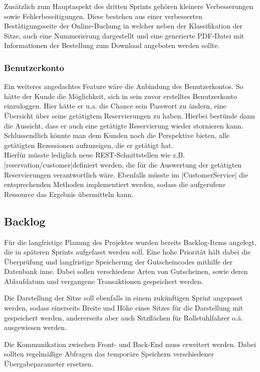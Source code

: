 Zusätzlich zum Hauptaspekt des dritten Sprints gehören kleinere Verbesserungen sowie Fehlerbeseitigungen. 
Diese bestehen aus einer verbesserten Bestätigungsseite der Online-Buchung in welcher neben der Klassifikation der Sitze, auch eine Nummerierung dargestellt und eine generierte PDF-Datei mit Informationen der Bestellung zum Download angeboten werden sollte.

\subsubsection*{Benutzerkonto}
\label{ssssec:sprint_benuterkonto}
Ein weiteres angedachtes Feature wäre die Anbindung des Benutzerkontos.
So hätte der Kunde die Möglichkeit, sich in sein zuvor erstelltes Benutzerkonto einzuloggen. 
Hier hätte er u.a. die Chance sein Passwort zu ändern, eine Übersicht über seine getätigtem Reservierungen zu haben. 
Hierbei bestünde dann die Aussicht, dass er auch eine getätigte Reservierung wieder stornieren kann. 
Schlussendlich könnte man dem Kunden noch die Perspektive bieten, alle getätigten Rezessionen aufzuzeigen, die er getätigt hat. \\

Hierfür müsste lediglich neue \acs{REST}-Schnittstellen wie z.B. \jinline|reservation/customer|definiert werden, die für die Auswertung der getätigten Reservierungen verantwortlich wäre. 
Ebenfalls müsste im \jinline|CustomerService| die entsprechenden Methoden implementiert werden, sodass die aufgerufene Ressource das Ergebnis übermitteln kann.

\subsection{Backlog}
Für die langfristige Planung des Projektes wurden bereits Backlog-Items angelegt, die in späteren Sprints aufgefasst werden soll.
Eine hohe Priorität hält dabei die Überprüfung und langfristige Speicherung der Gutscheincodes mithilfe der Datenbank inne.
Dabei sollen verschiedene Arten von Gutscheinen, sowie deren Ablaufdatum und vergangene Transaktionen gespeichert werden. 

Die Darstellung der Sitze soll ebenfalls in einem zukünftigen Sprint angepasst werden, sodass einerseits Breite und Höhe eines Sitzes für die Darstellung mit gespeichert werden, andererseits aber auch Sitzflächen für Rollstuhlfahrer o.ä. ausgewiesen werden.

Die Kommunikation zwischen Front- und Back-End muss erweitert werden. 
Dabei sollten regelmäßige Abfragen das temporäre Speichern verschiedener Übergabeparameter ersetzen.

